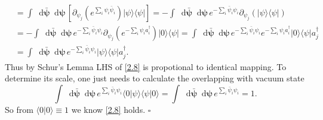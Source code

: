 \documentclass[10pt,nofootinbib]{revtex4}
\newcommand*\dd{\mathop{}\!\mathrm{d}}
\newcounter{Lemma}[section]
\newenvironment{Proof}{{\par~{\normalfont\bfseries $\vartriangleright$}~~}}{\hfill $\square$\par\hfill\par} %
\begin{document}
\begin{Proof}
\begin{align*}
			&=\int\dd\bm{\bar\psi}\dd\bm{\psi}\,\left[\partial_{\psi_j}\left(e^{\sum_i\psi_i\bar\psi_i}\right)|\psi\rangle\langle\psi|\right]=-\int\dd\bm{\bar\psi}\dd\bm{\psi}\,e^{-\sum_i\bar\psi_i\psi_i}\partial_{\psi_j}\left(|\psi\rangle\langle\psi|\right)\\
			&=-\int\dd\bm{\bar\psi}\dd\bm{\psi}\,e^{-\sum_i\bar\psi_i\psi_i}\partial_{\psi_j}\left(e^{-\sum_i\psi_i a_i^\dagger}\right)|0\rangle\langle\psi|=\int\dd\bm{\bar\psi}\dd\bm{\psi}\,e^{-\sum_i\bar\psi_i\psi_i}e^{-\sum_i\psi_i a_i^\dagger}|0\rangle\langle\psi|a_j^\dagger\\
			&=\int\dd\bm{\bar\psi}\dd\bm{\psi}\,e^{-\sum_i\bar\psi_i\psi_i}|\psi\rangle\langle\psi|a_j^\dagger.
		\end{align*}
		Thus by Schur's Lemma LHS of \eqref{2.8} is propotional to identical mapping. To determine its scale, one just needs to calculate the overlapping with vacuum state
		\begin{equation*}
			\int\dd\bm{\bar\psi}\dd\bm{\psi}\,e^{\sum_i\bar\psi_i\psi_i}\langle0|\psi\rangle\langle\psi|0\rangle=\int\dd\bm{\bar\psi}\dd\bm{\psi}\,e^{\sum_i\bar\psi_i\psi_i}=1.
		\end{equation*}
		So from $\langle0|0\rangle\equiv1$ we know \eqref{2.8} holds.
	\end{Proof}
\end{document}
